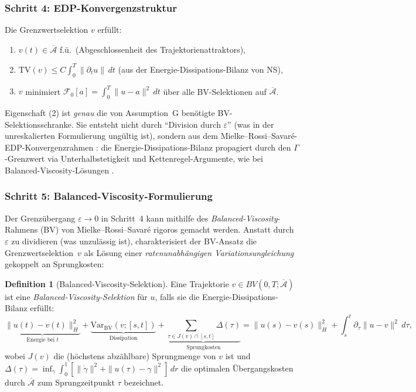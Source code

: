 \documentclass[12pt,a4paper]{article}
\theoremstyle{definition}
\newtheorem{definition}{Definition}[section]
\theoremstyle{plain}
\theoremstyle{remark}
\begin{document}
\subsubsection*{Schritt 4: EDP-Konvergenzstruktur}

Die Grenzwertselektion $v$ erf\"ullt:
\begin{enumerate}
\item $v(t) \in \overline{\mathcal{A}}$ f.\"u.\ (Abgeschlossenheit des Trajektorienattraktors),
\item $\mathrm{TV}(v) \leq C \int_0^T \|\partial_t u\| \, dt$ (aus der Energie-Dissipations-Bilanz von NS),
\item $v$ minimiert $\mathcal{F}_0[a] = \int_0^T \|u - a\|^2\,dt$ \"uber alle BV-Selektionen auf $\overline{\mathcal{A}}$.
\end{enumerate}
Eigenschaft (2) ist \emph{genau} die von Assumption~G ben\"otigte BV-Selektionsschranke. Sie entsteht nicht durch ``Division durch $\varepsilon$'' (was in der unreskalierten Formulierung ung\"ultig ist), sondern aus dem Mielke--Rossi--Savar\'e-EDP-Konvergenzrahmen \cite{MielkeRossiSavare2016}: die Energie-Dissipations-Bilanz propagiert durch den $\Gamma$-Grenzwert via Unterhalbstetigkeit und Kettenregel-Argumente, wie bei Balanced-Viscosity-L\"osungen \cite{MielkeRossiSavare2016}.

\subsubsection*{Schritt 5: Balanced-Viscosity-Formulierung}

Der Grenz\"ubergang $\varepsilon \to 0$ in Schritt~4 kann mithilfe des \emph{Balanced-Viscosity}-Rahmens (BV) von Mielke--Rossi--Savar\'e \cite{MielkeRossiSavare2016} rigoros gemacht werden. Anstatt durch $\varepsilon$ zu dividieren (was unzul\"assig ist), charakterisiert der BV-Ansatz die Grenzwertselektion~$v$ als L\"osung einer \emph{ratenunabh\"angigen Variationsungleichung} gekoppelt an Sprungkosten:

\begin{definition}[Balanced-Viscosity-Selektion]\label{def:bv-selection}
Eine Trajektorie $v \in BV(0,T;\overline{\mathcal{A}})$ ist eine \emph{Balanced-Viscosity-Selektion} f\"ur $u$, falls sie die Energie-Dissipations-Bilanz erf\"ullt:
\begin{equation}\label{eq:bv-edb}
  \underbrace{\|u(t) - v(t)\|_H^2}_{\text{Energie bei } t} + \underbrace{\mathrm{Var}_{\mathrm{BV}}(v;[s,t])}_{\text{Dissipation}} + \underbrace{\sum_{\tau \in J(v) \cap [s,t]} \Delta(\tau)}_{\text{Sprungkosten}} = \|u(s) - v(s)\|_H^2 + \int_s^t \partial_\tau \|u - v\|^2 \, d\tau,
\end{equation}
wobei $J(v)$ die (h\"ochstens abz\"ahlbare) Sprungmenge von $v$ ist und $\Delta(\tau) = \inf_\gamma \int_0^1 [\|\dot\gamma\|^2 + \|u(\tau) - \gamma\|^2]\,dr$ die optimalen \"Ubergangskosten durch $\overline{\mathcal{A}}$ zum Sprungzeitpunkt $\tau$ bezeichnet.
\end{definition}
\end{document}
